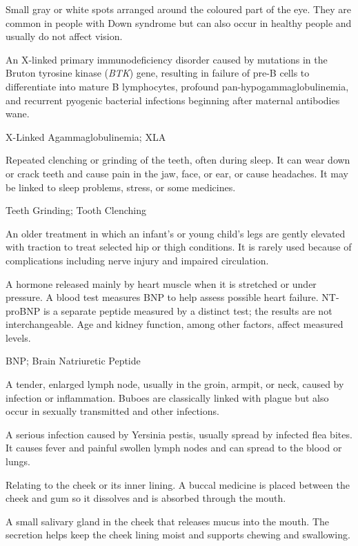  Small gray or white spots arranged around the coloured part of the eye. They are common in people with Down syndrome but can also occur in healthy people and usually do not affect vision.

 An X-linked primary immunodeficiency disorder caused by mutations in the Bruton tyrosine kinase (\textit{BTK}) gene, resulting in failure of pre-B cells to differentiate into mature B lymphocytes, profound pan-hypogammaglobulinemia, and recurrent pyogenic bacterial infections beginning after maternal antibodies wane.

\synonyms
X-Linked Agammaglobulinemia; XLA

 Repeated clenching or grinding of the teeth, often during sleep. It can wear down or crack teeth and cause pain in the jaw, face, or ear, or cause headaches. It may be linked to sleep problems, stress, or some medicines.

\synonyms
Teeth Grinding; Tooth Clenching

 An older treatment in which an infant's or young child's legs are gently elevated with traction to treat selected hip or thigh conditions. It is rarely used because of complications including nerve injury and impaired circulation.

 A hormone released mainly by heart
muscle when it is stretched or under pressure. A blood test measures BNP to
help assess possible heart failure. NT-proBNP is a separate peptide measured
by a distinct test; the results are not interchangeable. Age and kidney
function, among other factors, affect measured levels.

\synonyms
BNP; Brain Natriuretic Peptide

 A tender, enlarged lymph node, usually in the groin, armpit, or neck, caused by infection or inflammation. Buboes are classically linked with plague but also occur in sexually transmitted and other infections.

 A serious infection caused by Yersinia pestis, usually spread by infected flea bites. It causes fever and painful swollen lymph nodes and can spread to the blood or lungs.

 Relating to the cheek or its inner lining. A buccal medicine is placed between the cheek and gum so it dissolves and is absorbed through the mouth.

 A small salivary gland in the cheek that releases mucus into the mouth. The secretion helps keep the cheek lining moist and supports chewing and swallowing.

